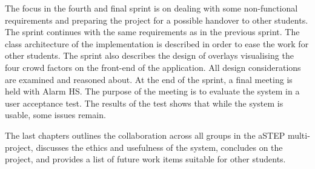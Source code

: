 The focus in the fourth and final sprint is on dealing with some non-functional requirements and preparing the project for a possible handover to other students. The sprint continues with the same requirements as in the previous sprint. The class architecture of the implementation is described in order to ease the work for other students. The sprint also describes the design of overlays visualising the four crowd factors on the front-end of the application. All design considerations are examined and reasoned about. At the end of the sprint, a final meeting is held with Alarm HS. The purpose of the meeting is to evaluate the system in a user acceptance test. The results of the test shows that while the system is usable, some issues remain.

The last chapters outlines the collaboration across all groups in the aSTEP multi-project, discusses the ethics and usefulness of the system, concludes on the project, and provides a list of future work items suitable for other students.
